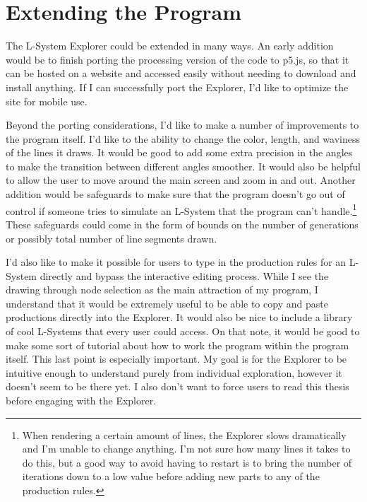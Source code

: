 \documentclass[12pt,twoside]{reedthesis}
\begin{document}
\section{Extending the Program}
\label{Extensions}

	The L-System Explorer could be extended in many ways. An early addition would be to finish porting the processing version of the code to p5.js, so that it can be hosted on a website and accessed easily without needing to download and install anything. If I can successfully port the Explorer, I'd like to optimize the site for mobile use.
	
	Beyond the porting considerations, I'd like to make a number of improvements to the program itself. I'd like to the ability to change the color, length, and waviness of the lines it draws. It would be good to add some extra precision in the angles to make the transition between different angles smoother. It would also be helpful to allow the user to move around the main screen and zoom in and out. Another addition would be safeguards to make sure that the program doesn't go out of control if someone tries to simulate an L-System that the program can't handle.\footnote{When rendering a certain amount of lines, the Explorer slows dramatically and I'm unable to change anything. I'm not sure how many lines it takes to do this, but a good way to avoid having to restart is to bring the number of iterations down to a low value before adding new parts to any of the production rules.} These safeguards could come in the form of bounds on the number of generations or possibly total number of line segments drawn. 
	
	I'd also like to make it possible for users to type in the production rules for an L-System directly and bypass the interactive editing process. While I see the drawing through node selection as the main attraction of my program, I understand that it would be extremely useful to be able to copy and paste productions directly into the Explorer. It would also be nice to include a library of cool L-Systems that every user could access. On that note, it would be good to make some sort of tutorial about how to work the program within the program itself. This last point is especially important. My goal is for the Explorer to be intuitive enough to understand purely from individual exploration, however it doesn't seem to be there yet. I also don't want to force users to read this thesis before engaging with the Explorer.
	
\end{document}
